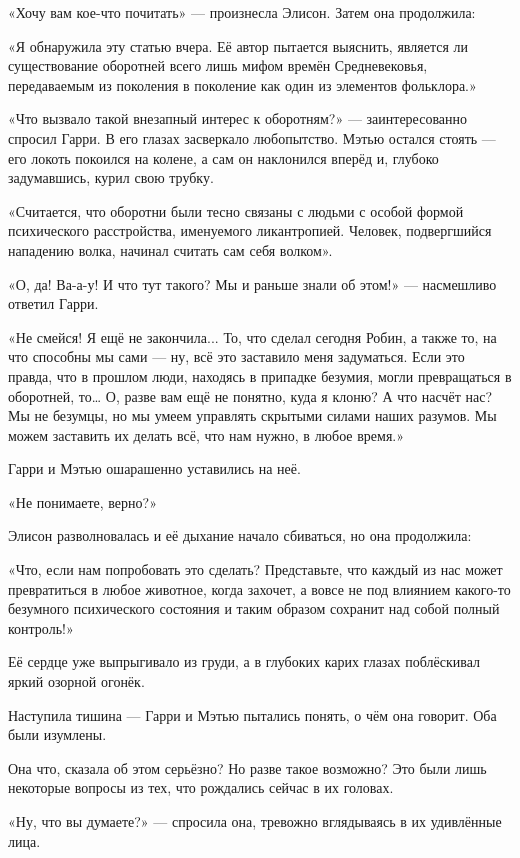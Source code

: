 \documentclass[a5paper, 9pt,
final, openany, twoside=true]{memoir}
\begin{document}
«Хочу вам кое-что почитать» — произнесла Элисон. Затем она продолжила:

«Я обнаружила эту статью вчера. Её автор пытается выяснить, является ли существование оборотней всего лишь мифом времён Средневековья, передаваемым из поколения в поколение как один из элементов фольклора.»\bigskip

«Что вызвало такой внезапный интерес к оборотням?» — заинтересованно спросил Гарри. В его глазах засверкало любопытство. Мэтью остался стоять — его локоть покоился на колене, а сам он наклонился вперёд и, глубоко задумавшись, курил свою трубку.

«Считается, что оборотни были тесно связаны с людьми с особой формой психического расстройства, именуемого ликантропией. Человек, подвергшийся нападению волка, начинал считать сам себя волком».

«О, да! Ва-а-у! И что тут такого? Мы и раньше знали об этом!» — насмешливо ответил Гарри.

«Не смейся! Я ещё не закончила... То, что сделал сегодня Робин, а также то, на что способны мы сами — ну, всё это заставило меня задуматься. Если это правда, что в прошлом люди, находясь в припадке безумия, могли превращаться в оборотней, то… О, разве вам ещё не понятно, куда я клоню? А что насчёт нас? Мы не безумцы, но мы умеем управлять скрытыми силами наших разумов. Мы можем заставить их делать всё, что нам нужно, в любое время.»

Гарри и Мэтью ошарашенно уставились на неё.

«Не понимаете, верно?»

Элисон разволновалась и её дыхание начало сбиваться, но она продолжила:

«Что, если нам попробовать это сделать? Представьте, что каждый из нас может превратиться в любое животное, когда захочет, а вовсе не под влиянием какого-то безумного психического состояния и таким образом сохранит над собой полный контроль!»\bigskip

Её сердце уже выпрыгивало из груди, а в глубоких карих глазах поблёскивал яркий озорной огонёк.

Наступила тишина — Гарри и Мэтью пытались понять, о чём она говорит. Оба были изумлены.

Она что, сказала об этом серьёзно? Но разве такое возможно? Это были лишь некоторые вопросы из тех, что рождались сейчас в их головах.

«Ну, что вы думаете?» — спросила она, тревожно вглядываясь в их удивлённые лица.
\end{document}

